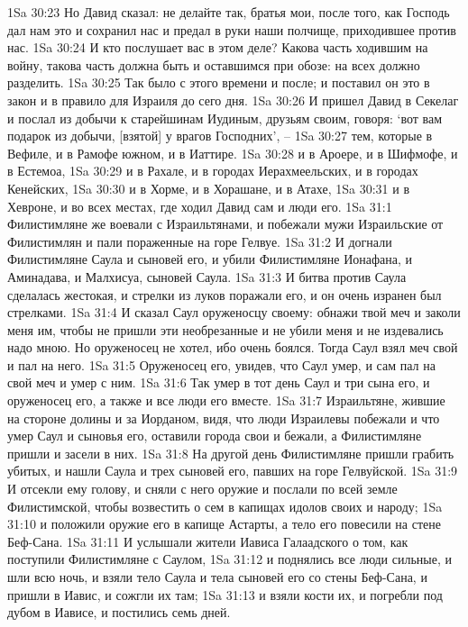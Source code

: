 1Sa 30:23  Но Давид сказал: не делайте так, братья мои, после того, как Господь дал нам это и сохранил нас и предал в руки наши полчище, приходившее против нас.
1Sa 30:24  И кто послушает вас в этом деле? Какова часть ходившим на войну, такова часть должна быть и оставшимся при обозе: на всех должно разделить.
1Sa 30:25  Так было с этого времени и после; и поставил он это в закон и в правило для Израиля до сего дня.
1Sa 30:26  И пришел Давид в Секелаг и послал из добычи к старейшинам Иудиным, друзьям своим, говоря: `вот вам подарок из добычи, [взятой] у врагов Господних', --
1Sa 30:27  тем, которые в Вефиле, и в Рамофе южном, и в Иаттире.
1Sa 30:28  и в Ароере, и в Шифмофе, и в Естемоа,
1Sa 30:29  и в Рахале, и в городах Иерахмеельских, и в городах Кенейских,
1Sa 30:30  и в Хорме, и в Хорашане, и в Атахе,
1Sa 30:31  и в Хевроне, и во всех местах, где ходил Давид сам и люди его.
1Sa 31:1  Филистимляне же воевали с Израильтянами, и побежали мужи Израильские от Филистимлян и пали пораженные на горе Гелвуе.
1Sa 31:2  И догнали Филистимляне Саула и сыновей его, и убили Филистимляне Ионафана, и Аминадава, и Малхисуа, сыновей Саула.
1Sa 31:3  И битва против Саула сделалась жестокая, и стрелки из луков поражали его, и он очень изранен был стрелками.
1Sa 31:4  И сказал Саул оруженосцу своему: обнажи твой меч и заколи меня им, чтобы не пришли эти необрезанные и не убили меня и не издевались надо мною. Но оруженосец не хотел, ибо очень боялся. Тогда Саул взял меч свой и пал на него.
1Sa 31:5  Оруженосец его, увидев, что Саул умер, и сам пал на свой меч и умер с ним.
1Sa 31:6  Так умер в тот день Саул и три сына его, и оруженосец его, а также и все люди его вместе.
1Sa 31:7  Израильтяне, жившие на стороне долины и за Иорданом, видя, что люди Израилевы побежали и что умер Саул и сыновья его, оставили города свои и бежали, а Филистимляне пришли и засели в них.
1Sa 31:8  На другой день Филистимляне пришли грабить убитых, и нашли Саула и трех сыновей его, павших на горе Гелвуйской.
1Sa 31:9  И отсекли ему голову, и сняли с него оружие и послали по всей земле Филистимской, чтобы возвестить о сем в капищах идолов своих и народу;
1Sa 31:10  и положили оружие его в капище Астарты, а тело его повесили на стене Беф-Сана.
1Sa 31:11  И услышали жители Иависа Галаадского о том, как поступили Филистимляне с Саулом,
1Sa 31:12  и поднялись все люди сильные, и шли всю ночь, и взяли тело Саула и тела сыновей его со стены Беф-Сана, и пришли в Иавис, и сожгли их там;
1Sa 31:13  и взяли кости их, и погребли под дубом в Иависе, и постились семь дней.



